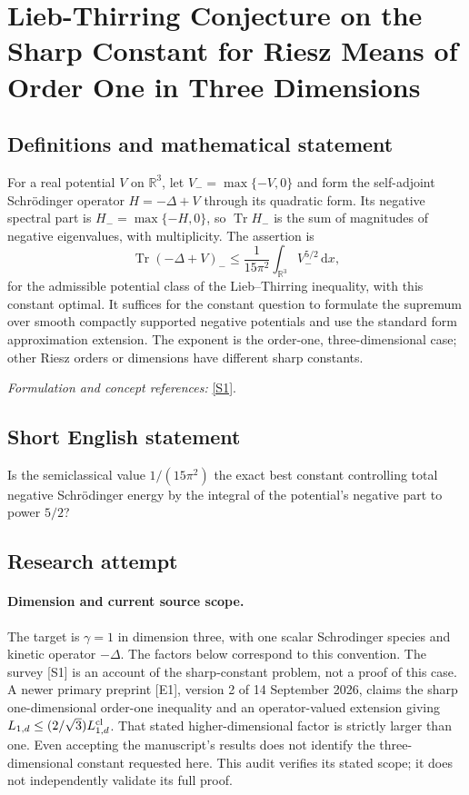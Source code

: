 \documentclass[11pt]{article}
\begin{document}
\section*{\texorpdfstring{Lieb-Thirring Conjecture on the Sharp Constant for Riesz Means of Order One in Three Dimensions}{Lieb-Thirring Conjecture on the Sharp Constant for Riesz Means of Order One in Three Dimensions}}\label{30006897}
\subsection{Definitions and mathematical statement}
For a real potential $V$ on ${\mathbb{R}}^3$, let $V_- =\max\{-V,0\}$ and form the self-adjoint Schr\"odinger operator $H=-\Delta+V$ through its quadratic form. Its negative spectral part is $H_-=\max\{-H,0\}$, so $\operatorname{Tr}H_-$ is the sum of magnitudes of negative eigenvalues, with multiplicity. The assertion is
\[
 \operatorname{Tr}(-\Delta+V)_-\le
 \frac1{15\pi^2}\int_{{\mathbb{R}}^3}V_-^{5/2}{\,\mathrm{d}} x,
\]
for the admissible potential class of the Lieb--Thirring inequality, with this constant optimal. It suffices for the constant question to formulate the supremum over smooth compactly supported negative potentials and use the standard form approximation extension. The exponent is the order-one, three-dimensional case; other Riesz orders or dimensions have different sharp constants.
\par\smallskip\textit{Formulation and concept references:} \href{https://arxiv.org/abs/2007.09326}{[S1]}.

\subsection{Short English statement}
Is the semiclassical value $1/(15\pi^2)$ the exact best constant controlling total negative Schr\"odinger energy by the integral of the potential's negative part to power $5/2$?
\subsection{Research attempt}
\paragraph{Dimension and current source scope.}
The target is $\gamma=1$ in dimension three, with one scalar
Schrodinger species and kinetic operator $-\Delta$. The factors
below correspond to this convention. The survey [S1] is an account
of the sharp-constant problem, not a proof of this case. A newer
primary preprint [E1], version 2 of 14 September 2026, claims the
sharp one-dimensional order-one inequality and an operator-valued
extension giving $L_{1,d}\leq(2/\sqrt3)L_{1,d}^{\rm cl}$. That
stated higher-dimensional factor is strictly larger than one.
Even accepting the manuscript's results does not identify the
three-dimensional constant requested here. This audit verifies its
stated scope; it does not independently validate its full proof.
\end{document}
